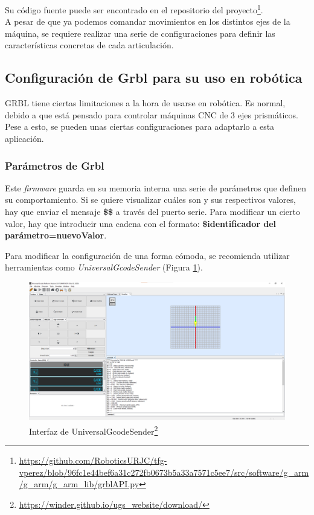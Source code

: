 Su código fuente puede ser encontrado en el repositorio del 
proyecto\footnote{\url{https://github.com/RoboticsURJC/tfg-vperez/blob/96fc1e44bef6a31c272fb0673b5a33a7571c5ee7/src/software/g_arm/g_arm/g_arm_lib/grblAPI.py}}.
\\

A pesar de que ya podemos comandar movimientos en los distintos ejes de la máquina, se requiere realizar una serie 
de configuraciones para definir las características concretas de cada articulación.
\newpage
\subsection{Configuración de Grbl para su uso en robótica}
\noindent GRBL tiene ciertas limitaciones a la hora de usarse en robótica. Es normal, debido a que está pensado para controlar máquinas 
\acs{CNC} de 3 ejes prismáticos. Pese a esto, se pueden unas ciertas configuraciones para adaptarlo a esta aplicación. 

\subsubsection{Parámetros de Grbl}
Este \textit{firmware} guarda en su memoria interna una serie de parámetros que definen su 
comportamiento. Si se quiere visualizar cuáles son y sus respectivos valores, hay que enviar 
el mensaje \textbf{\$\$} a través del puerto serie. Para modificar un cierto valor, hay que introducir una cadena 
con el formato: \textbf{\$identificador del parámetro=nuevoValor}.

Para modificar la configuración de una forma cómoda, se recomienda utilizar herramientas como 
\textit{UniversalGcodeSender} (Figura \ref{fig:ugs}).

\begin{figure} [ht!]
\begin{center}
    \includegraphics[width=15cm]{figs/ugs.png}
\end{center}
\caption{Interfaz de UniversalGcodeSender\footnote{\url{https://winder.github.io/ugs_website/download/}}}
\label{fig:ugs}
\end{figure}

